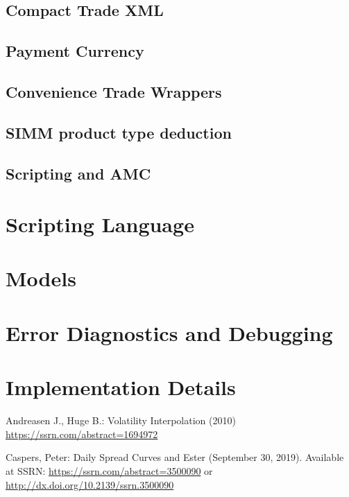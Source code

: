 \documentclass[12pt, a4paper]{article}
\begin{document}
\subsection{Compact Trade XML}\label{compactXml}


\subsection{Payment Currency}\label{sss:payccy_st}


\subsection{Convenience Trade Wrappers}


\subsection{SIMM product type deduction}


\subsection{Scripting and AMC}\label{scripting_amc}


\section{Scripting Language}


\section{Models}


\section{Error Diagnostics and Debugging}


\section{Implementation Details}


  
\begin{thebibliography}{*}

 Andreasen J., Huge B.: Volatility Interpolation (2010) \url{https://ssrn.com/abstract=1694972}

 Caspers, Peter: Daily Spread Curves and Ester (September 30, 2019). Available at SSRN:
  \url{https://ssrn.com/abstract=3500090} or \url{http://dx.doi.org/10.2139/ssrn.3500090}



\end{thebibliography}
\end{document}

